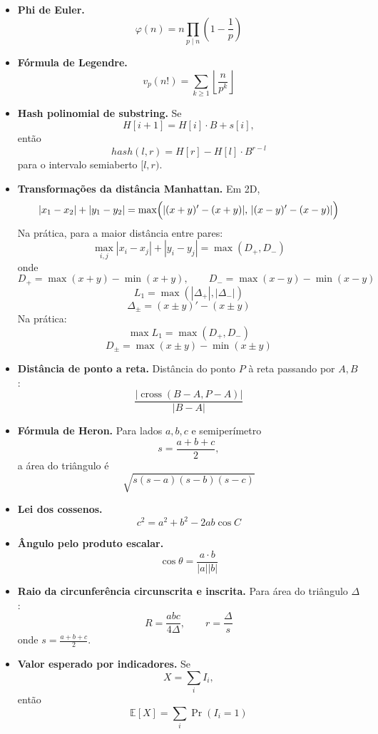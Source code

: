 \begin{itemize}[leftmargin=*,label={}]
  \ifextended
  \item \textbf{Phi de Euler.}
  \[
    \varphi(n)=n\prod_{p\mid n}\left(1-\frac1p\right)
  \]
  \fi

  \item \textbf{F\'ormula de Legendre.}
  \[
    v_p(n!)=\sum_{k\ge1}\left\lfloor \frac{n}{p^k}\right\rfloor
  \]

  \ifextended
  \item \textbf{Hash polinomial de substring.}
  Se
  \[
    H[i+1]=H[i]\cdot B+s[i],
  \]
  ent\~ao
  \[
    hash(l,r)=H[r]-H[l]\cdot B^{r-l}
  \]
  para o intervalo semiaberto $[l,r)$.
  \fi

  \item \textbf{Transforma\c{c}\~oes da dist\^ancia Manhattan.}
  Em 2D,
  \ifextended
  \[
    |x_1-x_2|+|y_1-y_2|
    = \max\Bigl(
      |(x+y)'-(x+y)|,\,
      |(x-y)'-(x-y)|
    \Bigr)
  \]
  Na pr\'atica, para a maior dist\^ancia entre pares:
  \[
    \max_{i,j}|x_i-x_j|+|y_i-y_j| = \max(D_+, D_-)
  \]
  onde
  \[
    D_+ = \max(x+y)-\min(x+y),\qquad
    D_- = \max(x-y)-\min(x-y)
  \]
  \else
  \[
    L_1 = \max(|\Delta_+|, |\Delta_-|)
  \]
  \[
    \Delta_\pm = (x\pm y)'-(x\pm y)
  \]
  Na pr\'atica:
  \[
    \max L_1 = \max(D_+, D_-)
  \]
  \[
    D_\pm = \max(x\pm y)-\min(x\pm y)
  \]
  \fi

  \ifextended
  \item \textbf{Dist\^ancia de ponto a reta.}
  Dist\^ancia do ponto $P$ \`a reta passando por $A,B$:
  \[
    \frac{|\operatorname{cross}(B-A,P-A)|}{|B-A|}
  \]
  \fi

  \item \textbf{F\'ormula de Heron.}
  Para lados $a,b,c$ e semiper\'imetro
  \[
    s=\frac{a+b+c}{2},
  \]
  a \'area do tri\^angulo \'e
  \[
    \sqrt{s(s-a)(s-b)(s-c)}
  \]

  \ifextended
  \item \textbf{Lei dos cossenos.}
  \[
    c^2=a^2+b^2-2ab\cos C
  \]
  \fi

  \ifextended
  \item \textbf{\^Angulo pelo produto escalar.}
  \[
    \cos\theta = \frac{a\cdot b}{|a||b|}
  \]
  \fi

  \item \textbf{Raio da circunfer\^encia circunscrita e inscrita.}
  Para \'area do tri\^angulo $\Delta$:
  \[
    R=\frac{abc}{4\Delta},\qquad r=\frac{\Delta}{s}
  \]
  onde $s=\frac{a+b+c}{2}$.

  \ifextended
  \item \textbf{Valor esperado por indicadores.}
  Se
  \[
    X=\sum_i I_i,
  \]
  ent\~ao
  \[
    \mathbb{E}[X]=\sum_i \Pr(I_i=1)
  \]
  \fi


\end{itemize}

